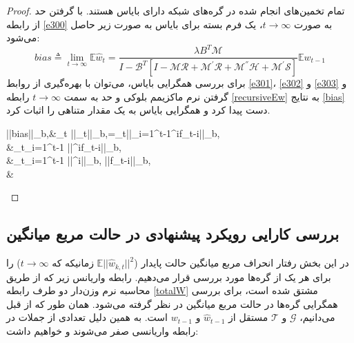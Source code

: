 \begin{proof}
	تمام تخمین‌های انجام شده در گره‌های شبکه دارای بایاس هستند. با گرفتن حد از رابطه \ref{e300} به صورت $t\rightarrow\infty$، یک فرم بسته برای بایاس به صورت زیر حاصل می‌شود:
	\begin{equation*}
		bias\triangleq \lim_{t\rightarrow \infty} \mathbb{E}\hat{w}_t=\frac{\lambda B^T \mathcal{M}}{I-\mathcal{B}^T [ I-\mathcal{M}\mathcal{R}+\mathcal{M}^{'}\mathcal{R}+\mathcal{M}^{''}\mathcal{H}+\mathcal{M}^{'}\mathcal{S}]}\mathbb{E}w_{t-1}
	\end{equation*}	
	برای بررسی همگرایی بایاس، می‌توان با بهره‌گیری از روابط \ref{e301}، \ref{e302} و \ref{e303} و گرفتن نرم ماکزیمم بلوکی و حد به سمت $t\rightarrow\infty$ رابطه \ref{recursiveEw} به نتایج \ref{bias} دست پیدا کرد و همگرایی بایاس به یک مقدار متناهی را اثبات کرد.
	\begin{flalign}\label{bias}
		||bias||_{b,\infty}\triangleq &\lim_{t\rightarrow \infty} ||_t||_{b,\infty}=\lim_{t\rightarrow \infty}||\sum_{i=1}^{t-1}{^i{f}_{t-i}}||_{b,\infty}\\
		&\le \lim_{t\rightarrow \infty}\sum_{i=1}^{t-1} ||{^i{f}_{t-i}}||_{b,\infty}\\
		&\le \lim_{t\rightarrow \infty}\sum_{i=1}^{t-1} ||^i||_{b,\infty} ||{f}_{t-i}||_{b,\infty}\\
		&\le {} \le {}
	\end{flalign}
	
\end{proof}

\subsection{بررسی کارایی رویکرد پیشنهادی در حالت مربع میانگین}
در این بخش رفتار انحراف مربع میانگین حالت پایدار ($\mathbb{E} ||\hat{w}_{k,t}||^2$ زمانیکه که $t\rightarrow \infty$) را برای هر یک از گره‌ها مورد بررسی قرار می‌دهیم. رابطه واریانس زیر که از طریق محاسبه نرم وزن‌دار دو طرف رابطه \ref{totalW} مشتق شده است، برای بررسی همگرایی گره‌ها در حالت مربع میانگین در نظر گرفته می‌شود. همان طور که از قبل می‌دانیم، $ \mathcal{G}$ و $ \mathcal{T}$ مستقل از $\hat{w}_{t-1}$ و $w_{t-1}$ است. به همین دلیل تعدادی از جملات در رابطه واریانسی صفر می‌شوند و خواهیم داشت:

